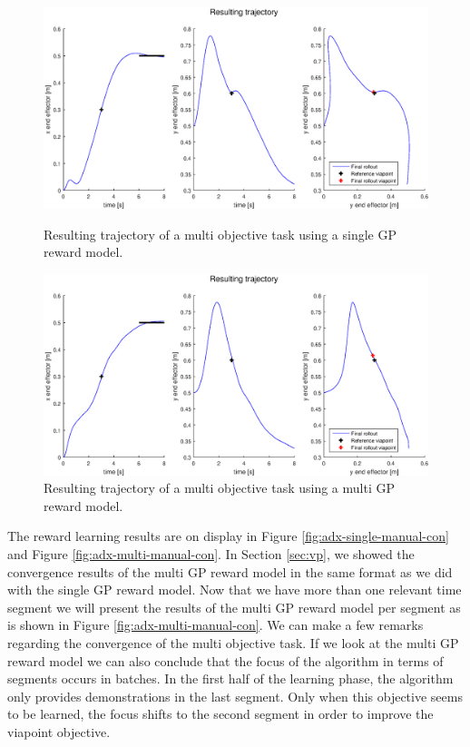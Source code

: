 \documentclass[mscThesis.tex]{subfiles}
\begin{document}
\begin{figure}[!htb]
    \begin{minipage}[b]{\linewidth}
        \centering
        \includegraphics[width=\textwidth, height = 6 cm]{figures/results/advancedx/trajectory_single_manual.eps}
        \caption{Resulting trajectory of a multi objective task using a single GP reward model.}
        \label{fig:adx-single-manual-traject}
        \vspace{4ex}
    \end{minipage}%
    
    \begin{minipage}[b]{\linewidth}
        \centering
        \includegraphics[width=\textwidth, height = 6 cm]{figures/results/advancedx/trajectory_multi_manual.eps}
        \caption{Resulting trajectory of a multi objective task using a multi GP reward model.}
        \label{fig:adx-multi-manual-traject}
    \end{minipage}%
\end{figure}

The reward learning results are on display in Figure \ref{fig:adx-single-manual-con} and Figure \ref{fig:adx-multi-manual-con}. In Section \ref{sec:vp}, we showed the convergence results of the multi GP reward model in the same format as we did with the single GP reward model. Now that we have more than one relevant time segment we will present the results of the multi GP reward model per segment as is shown in Figure \ref{fig:adx-multi-manual-con}. We can make a few remarks regarding the convergence of the multi objective task. If we look at the multi GP reward model we can also conclude that the focus of the algorithm in terms of segments occurs in batches. In the first half of the learning phase, the algorithm only provides demonstrations in the last segment. Only when this objective seems to be learned, the focus shifts to the second segment in order to improve the viapoint objective. 
\end{document}
